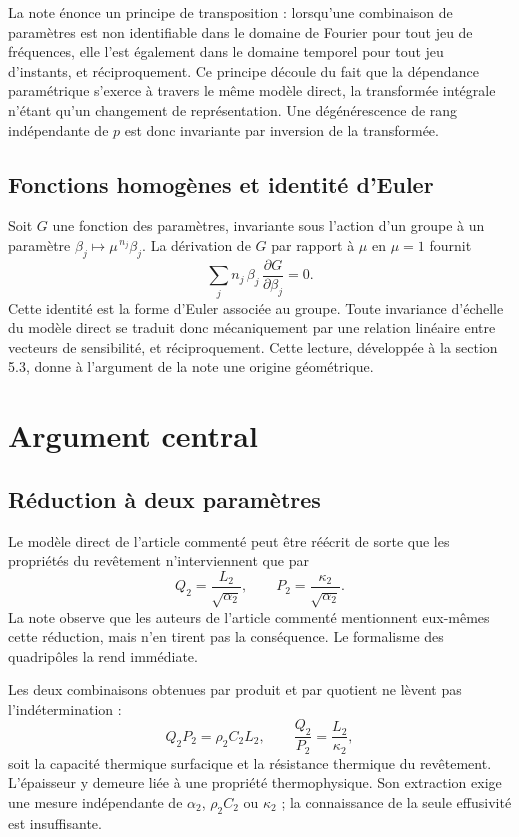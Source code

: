 \documentclass[11pt,a4paper]{article}
\begin{document}
La note énonce un principe de transposition : lorsqu'une combinaison de paramètres est non identifiable
dans le domaine de Fourier pour tout jeu de fréquences, elle l'est également dans le domaine temporel
pour tout jeu d'instants, et réciproquement. Ce principe découle du fait que la dépendance
paramétrique s'exerce à travers le même modèle direct, la transformée intégrale n'étant qu'un changement
de représentation. Une dégénérescence de rang indépendante de $p$ est donc invariante par inversion de
la transformée.

\subsection{Fonctions homogènes et identité d'Euler}

Soit $G$ une fonction des paramètres, invariante sous l'action d'un groupe à un paramètre
$\beta_{j}\mapsto\mu^{\,n_{j}}\beta_{j}$. La dérivation de $G$ par rapport à $\mu$ en $\mu=1$ fournit
\[ \sum_{j} n_{j}\,\beta_{j}\,\frac{\partial G}{\partial\beta_{j}} = 0 . \]
Cette identité est la forme d'Euler associée au groupe. Toute invariance d'échelle du modèle direct se
traduit donc mécaniquement par une relation linéaire entre vecteurs de sensibilité, et réciproquement.
Cette lecture, développée à la section 5.3, donne à l'argument de la note une origine géométrique.

\section{Argument central}

\subsection{Réduction à deux paramètres}

Le modèle direct de l'article commenté peut être réécrit de sorte que les propriétés du revêtement
n'interviennent que par
\[ Q_{2} = \frac{L_{2}}{\sqrt{\alpha_{2}}} , \qquad P_{2} = \frac{\kappa_{2}}{\sqrt{\alpha_{2}}} . \]
La note observe que les auteurs de l'article commenté mentionnent eux-mêmes cette réduction, mais n'en
tirent pas la conséquence. Le formalisme des quadripôles la rend immédiate.

Les deux combinaisons obtenues par produit et par quotient ne lèvent pas l'indétermination :
\[ Q_{2}P_{2} = \rho_{2}C_{2}L_{2} , \qquad \frac{Q_{2}}{P_{2}} = \frac{L_{2}}{\kappa_{2}} , \]
soit la capacité thermique surfacique et la résistance thermique du revêtement. L'épaisseur y demeure
liée à une propriété thermophysique. Son extraction exige une mesure indépendante de $\alpha_{2}$,
$\rho_{2}C_{2}$ ou $\kappa_{2}$ ; la connaissance de la seule effusivité est insuffisante.
\end{document}
